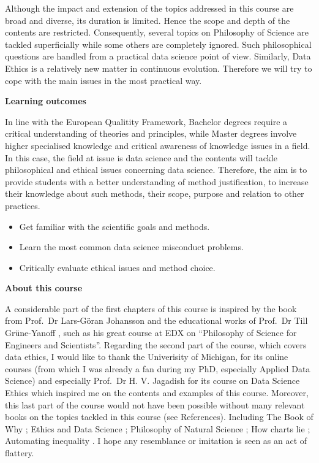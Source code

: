 \documentclass[
]{book}
\providecommand{\tightlist}{%
  \setlength{\itemsep}{0pt}\setlength{\parskip}{0pt}}
\begin{document}
Although the impact and extension of the topics addressed in this course are broad and diverse, its duration is limited. Hence the scope and depth of the contents are restricted. Consequently, several topics on Philosophy of Science are tackled superficially while some others are completely ignored. Such philosophical questions are handled from a practical data science point of view. Similarly, Data Ethics is a relatively new matter in continuous evolution. Therefore we will try to cope with the main issues in the most practical way.

\textbf{Learning outcomes}

In line with the European Qualitity Framework, Bachelor degrees require a critical understanding of theories and principles, while Master degrees involve higher specialised knowledge and critical awareness of knowledge issues in a field. In this case, the field at issue is data science and the contents will tackle philosophical and ethical issues concerning data science. Therefore, the aim is to provide students with a better understanding of method justification, to increase their knowledge about such methods, their scope, purpose and relation to other practices.

\begin{itemize}
\tightlist
\item
  Get familiar with the scientific goals and methods.
\item
  Learn the most common data science misconduct problems.
\item
  Critically evaluate ethical issues and method choice.
\end{itemize}

\textbf{About this course}

A considerable part of the first chapters of this course is inspired by the book from Prof.~Dr Lars-Göran Johansson \citep{johansson2016philosophy} and the educational works of Prof.~Dr Till Grüne-Yanoff \citep{grune2014teaching}, such as his great course at EDX on ``Philosophy of Science for Engineers and Scientists''. Regarding the second part of the course, which covers data ethics, I would like to thank the Univerisity of Michigan, for its online courses (from which I was already a fan during my PhD, especially Applied Data Science) and especially Prof.~Dr H. V. Jagadish for its course on Data Science Ethics which inspired me on the contents and examples of this course. Moreover, this last part of the course would not have been possible without many relevant books on the topics tackled in this course (see References). Including The Book of Why \citep{book-of-why}; Ethics and Data Science \citep{loukides2018ethics}; Philosophy of Natural Science \citep{hempel-pos}; How charts lie \citep{cairo2019charts}; Automating inequality \citep{eubanks2018automating}. I hope any resemblance or imitation is seen as an act of flattery.
\end{document}
